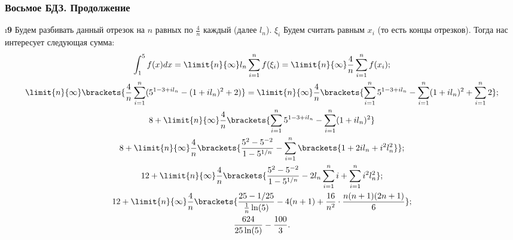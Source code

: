 \subsubsection{Восьмое БДЗ. Продолжение}

\setcounter{iii}{14}

\i \textbf{9} Будем разбивать данный отрезок на $n$ равных по $\frac{4}{n}$ каждый (далее $l_n$). $\xi_i$ Будем считать равным $x_i$ (то есть концы отрезков). Тогда нас интересует следующая сумма:
\begin{gather*}
    \int_1^5 f(x)dx = \limit{n}{\infty} l_n \sum_{i=1}^{n} f(\xi_i) = \limit{n}{\infty} \frac{4}{n} \sum_{i=1}^{n} f(x_i);\\
    \limit{n}{\infty} \brackets{\frac{4}{n}\sum_{i=1}^{n} (5^{1-3+il_n} - (1+il_n)^2 + 2)} = \limit{n}{\infty} \frac{4}{n}\brackets{\sum_{i=1}^{n}5^{1-3+il_n} - \sum_{i=1}^{n}(1+il_n)^2 + \sum_{i=1}^{n}2};\\
    8 + \limit{n}{\infty} \frac{4}{n}\brackets{\sum_{i=1}^{n}5^{1-3+il_n} - \sum_{i=1}^{n}(1+il_n)^2}\\
    8 + \limit{n}{\infty}\frac{4}{n}\brackets{\frac{5^2 - 5^{-2}}{1-5^{1/n}} - \sum_{i=1}^{n}\brackets{1 + 2il_n + i^2l_n^2}};\\
    12 + \limit{n}{\infty}\frac{4}{n}\brackets{\frac{5^2 - 5^{-2}}{1-5^{1/n}} - 2l_n\sum_{i=1}^{n}i + \sum_{i=1}^{n}i^2l_n^2};\\
    12 + \limit{n}{\infty}\frac{4}{n}\brackets{\frac{25 - 1/25}{\frac{1}{n}\ln(5)} - 4(n+1) + \frac{16}{n^2}\cdot\frac{n(n+1)(2n+1)}{6}};\\
    \frac{624}{25\ln(5)} - \frac{100}{3}.
\end{gather*}